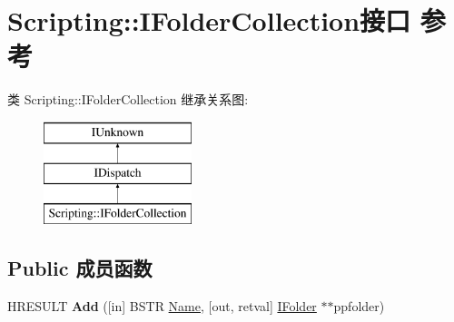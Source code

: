 \hypertarget{interface_scripting_1_1_i_folder_collection}{}\section{Scripting\+:\+:I\+Folder\+Collection接口 参考}
\label{interface_scripting_1_1_i_folder_collection}
类 Scripting\+:\+:I\+Folder\+Collection 继承关系图\+:\begin{figure}[H]
\begin{center}
\leavevmode
\includegraphics[height=3.000000cm]{interface_scripting_1_1_i_folder_collection}
\end{center}
\end{figure}
\subsection*{Public 成员函数}
\begin{DoxyCompactItemize}
\item 
\mbox{\label{interface_scripting_1_1_i_folder_collection_a971d72ea456cfe744b83beb6d634695d}} 
H\+R\+E\+S\+U\+LT {\bfseries Add} (\mbox{[}in\mbox{]} B\+S\+TR \hyperlink{struct_name_rec__}{Name}, \mbox{[}out, retval\mbox{]} \hyperlink{interface_scripting_1_1_i_folder}{I\+Folder} $\ast$$\ast$ppfolder)
\end{DoxyCompactItemize}
